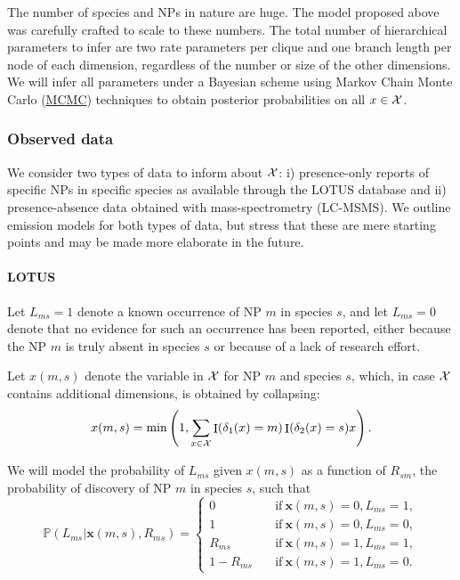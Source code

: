 \documentclass[
11pt, %
oneside, %
english, %
singlespacing, %
headsepline, %
chapterinoneline, %
]{MastersDoctoralThesis} %
\DeclareMathOperator{\Ind}{I}
\def\P{\mathbb{P}}
\def\x{\boldsymbol{x}}
\def\X{{\cal X}}
\begin{document}
The number of species and NPs in nature are huge. The model proposed above was carefully crafted to scale to these numbers. The total number of hierarchical parameters to infer are two rate parameters per clique and one branch length per node of each dimension, regardless of the number or size of the other dimensions. We will infer all parameters under a Bayesian scheme using Markov Chain Monte Carlo (\href{https://en.wikipedia.org/wiki/Markov_chain_Monte_Carlo}{MCMC}) techniques to obtain posterior probabilities on all $x \in \X$.

\subsubsection{Observed data}

We consider two types of data to inform about $\X$:  i) presence-only reports of specific NPs in specific species as available through the LOTUS database \cite{rutz_2022a} and ii) presence-absence data obtained with mass-spectrometry (LC-MSMS). We outline emission models for both types of data, but stress that these are mere starting points and may be made more elaborate in the future.

\paragraph{LOTUS }

Let $L_{ms} = 1$ denote a known occurrence of NP $m$ in species $s$, and let $L_{ms}=0$ denote that no evidence for such an occurrence has been reported, either because the NP $m$ is truly absent in species $s$ or because of a lack of research effort.

Let $x(m,s)$ denote the variable in $\X$ for NP $m$ and species $s$, which, in case $\X$ contains additional dimensions, is obtained by collapsing:
\begin{equation*}
	x(m,s) = \min \left(1, \sum_{x \in \X} \Ind(\delta_1(x)=m) \Ind(\delta_2(x)=s) x \right).
\end{equation*}

We will model the probability of $L_{ms}$ given $x(m,s)$ as a function of $R_{sm}$, the probability of discovery of NP $m$ in species $s$, such that
\begin{equation*}
	\P(L_{ms}|\x(m,s), R_{ms}) =
	\begin{cases}
		0 \quad &\mathrm{if\ } \x(m,s)=0, L_{ms} = 1,\\
		1 \quad &\mathrm{if\ } \x(m,s)=0, L_{ms} = 0,\\
		R_{ms} \quad &\mathrm{if\ } \x(m,s)=1, L_{ms} = 1,\\
		1- R_{ms} \quad &\mathrm{if\ } \x(m,s)=1, L_{ms} = 0.
	\end{cases}
\end{equation*}
\end{document}
